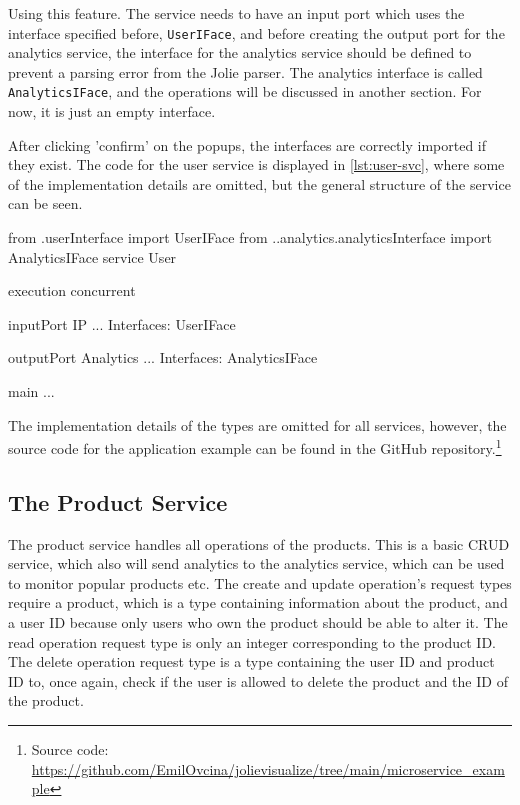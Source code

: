 Using this feature. The service needs to have an input port which uses the interface specified before, \texttt{UserIFace}, and before creating the output port for the analytics service, the interface for the analytics service should be defined to prevent a parsing error from the Jolie parser. 
The analytics interface is called \texttt{AnalyticsIFace}, and the operations will be discussed in another section. For now, it is just an empty interface.

After clicking 'confirm' on the popups, the interfaces are correctly imported if they exist. The code for the user service is displayed in
\cref{lst:user-svc}, where some of the implementation details are omitted, but the general structure of the service can be seen.

\begin{jolisting}[][caption={The user service after the ports have been created with omitted implementation details.}, label={lst:user-svc}]
from .userInterface import UserIFace
from ..analytics.analyticsInterface import AnalyticsIFace
service User {

    execution{ concurrent }

    inputPort IP {
        ...
        Interfaces: UserIFace
    }

    outputPort Analytics {
        ...
        Interfaces: AnalyticsIFace
    }

    main {
        ...
    }
}
\end{jolisting}

The implementation details of the types are omitted for all services, however, the source code for the application example can be found in the GitHub repository.\footnote{Source code: \url{https://github.com/EmilOvcina/jolievisualize/tree/main/microservice_example}}

\subsection{The Product Service}
The product service handles all operations of the products. This is a basic CRUD service, which also will send analytics to the analytics service, which can be used to monitor popular products etc.
The create and update operation's request types require a product, which is a type containing information about the product, and a user ID because only users who own the product should be able to alter it.
The read operation request type is only an integer corresponding to the product ID. The delete operation request type is a type containing the user ID and product ID to, once again, check if the user is allowed to delete the product and the ID of the product.

